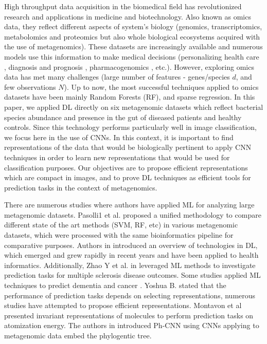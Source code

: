 \documentclass{article}
\begin{document}
High throughput data acquisition in the biomedical field has revolutionized research and applications in medicine and biotechnology. Also known as omics data, they reflect different aspects of system's biology (genomics, transcriptomics, metabolomics and proteomics but also whole biological ecosystems acquired with the use of metagenomics). These datasets are increasingly available and numerous models use this information to make medical decisions \cite{Genomic_applications} (personalizing health care \cite{meta_personnal_medicine}, diagnosis and prognosis \cite{ML_large_metagenomic_tool_insight2016}, pharmacogenomics \cite{pharmacogenetics_2005}, etc.). However, exploring omics data has met many challenges (large number of features - genes/species $d$, and few observations $N$). Up to now, the most successful techniques applied to omics datasets have been mainly Random Forests (RF), and sparse regression. 
In this paper, we applied DL directly on six metagenomic datasets which reflect bacterial species abundance and presence in the gut of diseased patients and healthy controls. Since this technology performs particularly well in image classification, we focus here in the use of CNNs. In this context, it is important to find representations of the data that would be biologically pertinent to apply CNN techniques in order to learn new representations that would be used for classification purposes. Our objectives are to propose efficient representations which are compact in images, and to prove DL techniques as efficient tools for prediction tasks in the context of metagenomics.


There are numerous studies where authors have applied ML for analyzing large metagenomic datasets. Pasolli1 et al. \cite{ML_large_metagenomic_tool_insight2016} proposed a unified methodology to compare different state of the art methods (SVM, RF, etc) in various metagenomic datasets, which were processed with the same bioinformatics pipeline for comparative purposes. Authors in \cite{Deep_Learning_Health_Informatics_2017} introduced an overview of technologies in DL, which emerged and grew rapidly in recent years and have been applied to health informatics. Additionally, Zhao Y et al. in \cite{Exploration_machine_learning_sclerosis_disease_2017} leveraged ML methods to investigate prediction tasks for multiple sclerosis disease outcomes. Some studies applied ML techniques to predict dementia \cite{dementia_prognosis_2017} and cancer \cite{cancer_prognosis_and_prediction_2015}. Yoshua B. stated \cite{Bengio:2013:RLR:2498740.2498889_Representation_review} that the performance of prediction tasks depends on selecting representations, numerous studies have attempted to propose efficient representations. Montavon et al \cite{Montavon:2012:LIR:2999134.2999184} presented invariant representations of molecules to perform prediction tasks on atomization energy. The authors in \cite{fioravanti_phylogenetic_2017} introduced Ph-CNN using CNNs applying to metagenomic data embed the phylogentic tree.
\end{document}
